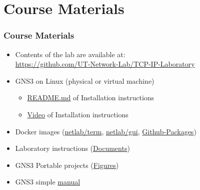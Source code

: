 \documentclass[aspectratio=169,15pt]{beamer}
\begin{document}
\section{Course Materials}
\begin{frame}
    \frametitle{Course Materials}

    \begin{itemize}
        \item Contents of the lab are available at:\\
              \url{https://github.com/UT-Network-Lab/TCP-IP-Laboratory}
        \item GNS3 on Linux (physical or virtual machine)
              \begin{itemize}
                  \item \href{https://github.com/UT-Network-Lab/TCP-IP-Laboratory/blob/master/README.md}{README.md} of Installation instructions
                  \item \href{https://www.dropbox.com/s/bad8eongryfnylr/GNS3\%20Installation\%20Tutorial.mp4?dl=0}{Video} of Installation instructions
              \end{itemize}
        \item Docker images (\href{https://hub.docker.com/r/utnetlab/term}{netlab/term}, \href{https://hub.docker.com/r/utnetlab/gui}{netlab/gui}, \href{https://github.com/orgs/UT-Network-Lab/packages?repo_name=docker-tools}{Github-Packages})
        \item Laboratory instructions (\href{https://github.com/UT-Network-Lab/TCP-IP-Laboratory/releases/latest}{Documents})
        \item GNS3 Portable projects (\href{https://github.com/UT-Network-Lab/gns3-figures/releases/latest}{Figures})
        \item GNS3 simple \href{https://github.com/UT-Network-Lab/TCP-IP-Laboratory/blob/master/gns3.md}{manual}
    \end{itemize}

\end{frame}
\end{document}
